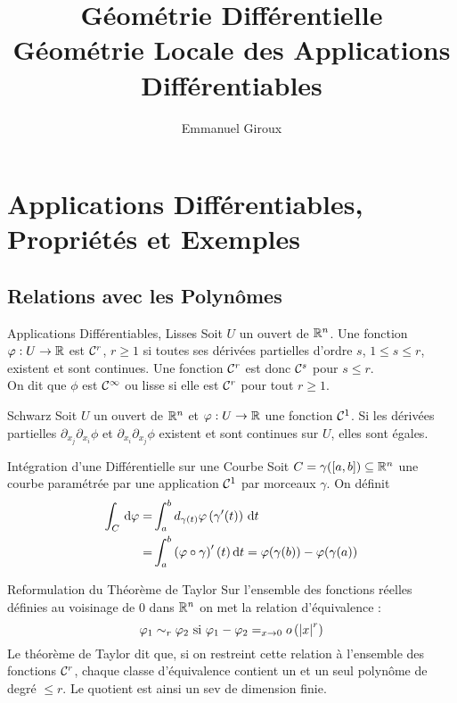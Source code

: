 \documentclass{cours}
\title{Géométrie Différentielle\\ \small Géométrie Locale des Applications Différentiables}
\author{Emmanuel Giroux}
\begin{document}
\section{Applications Différentiables, Propriétés et Exemples}
\subsection{Relations avec les Polynômes}
\begin{définition}{Applications Différentiables, Lisses}{}
    Soit $U$ un ouvert de $\mathbb{R}^{n}$. Une fonction $\varphi : U \to \mathbb{R}$ est $\mathcal{C}^{r}$, $r \geq 1$ si toutes ses dérivées partielles d'ordre $s$, $1 \leq s \leq r$, existent et sont continues. Une fonction $\mathcal{C}^{r}$ est donc $\mathcal{C}^{s}$ pour $s \leq r$. \\
    On dit que $\phi$ est $\mathcal{C}^{\infty}$ ou lisse si elle est $\mathcal{C}^{r}$ pour tout $r \geq 1$. 
\end{définition}

\begin{théorème}{Schwarz}{}
    Soit $U$ un ouvert de $\mathbb{R}^{n}$ et $\varphi : U \to \mathbb{R}$ une fonction $\mathcal{C}^{1}$. Si les dérivées partielles $\partial_{x_{j}}\partial_{x_{i}}\phi$ et $\partial_{x_{i}}\partial_{x_{j}}\phi$ existent et sont continues sur $U$, elles sont égales. 
\end{théorème}

\begin{propositionfr}{Intégration d'une Différentielle sur une Courbe}{}
    Soit $C = \gamma([a, b]) \subseteq \mathbb{R}^{n}$ une courbe paramétrée par une application $\mathcal{C}^{1}$ par morceaux $\gamma$. On définit 
    \[
        \begin{aligned}
            \int_{C} {\rm \, d} \varphi =& \int_{a}^{b}d_{\gamma(t)}\varphi\left(\gamma'(t)\right) {\rm \, d} t\\
            =& \int_{a}^{b}\left(\varphi \circ \gamma\right)'(t){\rm \, d} t = \varphi(\gamma(b)) - \varphi(\gamma(a))
        \end{aligned}
    \]
\end{propositionfr}

\begin{remarque}{Reformulation du Théorème de Taylor}{}
    Sur l'ensemble des fonctions réelles définies au voisinage de $0$ dans $\mathbb{R}^{n}$ on met la relation d'équivalence : 
    \[
        \varphi_{1} \sim_{r} \varphi_{2} \text{ si } \varphi_{1} - \varphi_{2} =_{x \to 0} o\left(\left|x\right|^{r}\right)
    \]
    Le théorème de Taylor dit que, si on restreint cette relation à l'ensemble des fonctions $\mathcal{C}^{r}$, chaque classe d'équivalence contient un et un seul polynôme de degré $\leq r$. Le quotient est ainsi un sev de dimension finie. 
\end{remarque}
\end{document}
